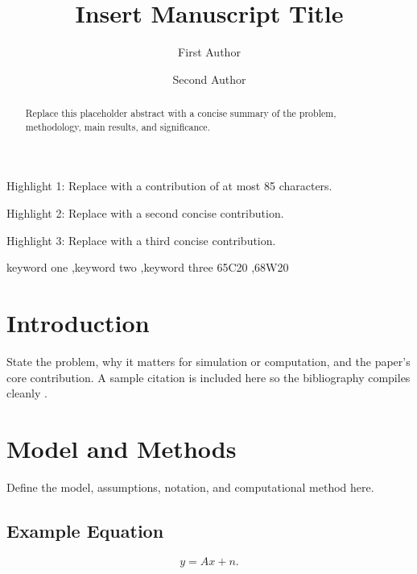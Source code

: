 \documentclass[preprint,12pt]{elsarticle}
\begin{document}
\begin{frontmatter}

\title{Insert Manuscript Title}

\author[inst1]{First Author}

\author[inst1]{Second Author}


\address[inst1]{Department / Institution, Street Address, City, Postal Code, Country}

\begin{abstract}
Replace this placeholder abstract with a concise summary of the problem,
methodology, main results, and significance.
\end{abstract}

\begin{highlights}
\item Highlight 1: Replace with a contribution of at most 85 characters.
\item Highlight 2: Replace with a second concise contribution.
\item Highlight 3: Replace with a third concise contribution.
\end{highlights}

\begin{keyword}
keyword one \sep keyword two \sep keyword three
\MSC[2020] 65C20 \sep 68W20
\end{keyword}

\end{frontmatter}

\section{Introduction}
State the problem, why it matters for simulation or computation, and the
paper's core contribution. A sample citation is included here so the
bibliography compiles cleanly \citep{example2024}.

\section{Model and Methods}
Define the model, assumptions, notation, and computational method here.

\subsection{Example Equation}
\begin{equation}
  y = Ax + n.
\end{equation}
\end{document}
